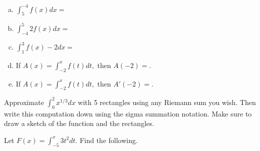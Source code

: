 \documentclass[11 pt]{exam}
\begin{document}
\begin{questions}
\begin{enumerate}[(a)]
\begin{solution}[0.3in]
\end{solution}

\item $\displaystyle \int_{5}^{-4} f(x) dx = $\\

\begin{solution}[0.3in] 
\end{solution}


\item $\displaystyle \int_{-4}^{5} 2f(x) dx = $\\

\begin{solution}[0.3in]

\end{solution}

\item $\displaystyle \int_{1}^{3} f(x)-2 dx = $\\

\begin{solution}[0.3in]
\end{solution}

\item If $A(x) = \displaystyle \int_{-2}^{x} f(t) dt,$ then $A(-2) = $.\\

\begin{solution}
\end{solution}

\item If $A(x) = \displaystyle \int_{-2}^{x} f(t) dt,$ then $A'(-2) = $.\\

\begin{solution}
\end{solution}

\end{enumerate}


 \question[20] Approximate $\displaystyle \int_{0}^2 x^{1/3} dx$ with 5 rectangles using any Riemann sum you wish. Then write this computation down using the sigma summation notation. Make sure to draw a sketch of the function and the rectangles. 
 
 \begin{solution}[3in]
 \end{solution}
 
 
 \question[20]  Let $\displaystyle F(x) = \int_{-5}^x 3t^2 dt$. Find the following.
 
 
 \begin{enumerate}[(a)]
 	

\end{enumerate}
\end{questions}
\end{document}
